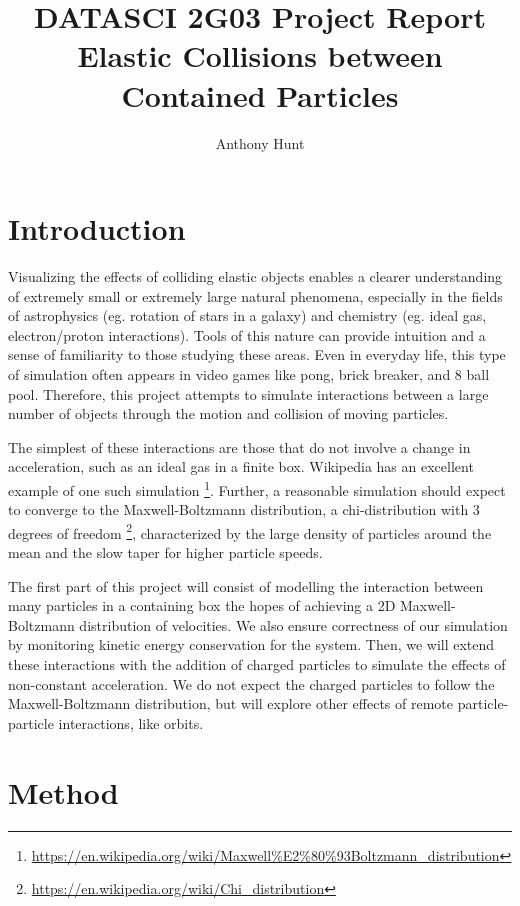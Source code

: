 \documentclass{article}
\title{DATASCI 2G03 Project Report \\\large
Elastic Collisions between Contained Particles}
\author{Anthony Hunt}
\begin{document}
\maketitle

\section{Introduction}
Visualizing the effects of colliding elastic objects enables a clearer understanding of extremely small or extremely large natural phenomena,
especially in the fields of astrophysics (eg. rotation of stars in a galaxy) and chemistry (eg. ideal gas, electron/proton interactions).
Tools of this nature can provide intuition and a sense of familiarity to those studying these areas.
Even in everyday life, this type of simulation often appears in video games like pong, brick breaker, and 8 ball pool.
Therefore, this project attempts to simulate interactions between a large number of objects through
the motion and collision of moving particles.

The simplest of these interactions are those that do not involve a change in acceleration,
such as an ideal gas in a finite box. Wikipedia has an excellent example of one such simulation
\footnote{\url{https://en.wikipedia.org/wiki/Maxwell\%E2\%80\%93Boltzmann_distribution}}.
Further, a reasonable simulation should expect to converge to the Maxwell-Boltzmann distribution,
a chi-distribution with 3 degrees of freedom \footnote{\url{https://en.wikipedia.org/wiki/Chi_distribution}},
characterized by the large density of particles around the mean and the slow taper for higher particle speeds.

The first part of this project will consist of modelling the interaction between many particles
in a containing box the hopes of achieving a 2D Maxwell-Boltzmann distribution of velocities.
We also ensure correctness of our simulation by monitoring kinetic energy conservation for the system.
Then, we will extend these interactions with the addition of charged particles to simulate the effects of non-constant acceleration.
We do not expect the charged particles to follow the Maxwell-Boltzmann distribution,
but will explore other effects of remote particle-particle interactions, like orbits.


\section{Method}
\end{document}

